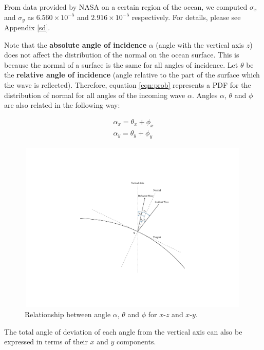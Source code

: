 \documentclass{article}
\begin{document}
From data provided by NASA on a certain region of the ocean, we computed $\sigma_x$ and $\sigma_y$ as $6.560 \times 10^{-5}$ and $2.916 \times 10^{-5}$ respectively. For details, please see Appendix \ref{sd}.

Note that the \textbf{absolute angle of incidence} $\alpha$ (angle with the vertical axis $z$) does not affect the distribution of the normal on the ocean surface. This is because the normal of a surface is the same for all angles of incidence. Let $\theta$ be the \textbf{relative angle of incidence} (angle relative to the part of the surface which the wave is reflected). Therefore, equation \eqref{eqn:prob} represents a PDF for the distribution of normal for all angles of the incoming wave $\alpha$. Angles $\alpha$, $\theta$ and $\phi$ are also related in the following way:

\begin{align}
    \alpha_x = \theta_x + \phi_x\\
    \alpha_y = \theta_y + \phi_y
\end{align}

\begin{figure}[htbp]
    \centering
    \includegraphics[width=420,height=310,clip,trim=200 150 200 150]{angle-rel.pdf}
    \caption{Relationship between angle $\alpha$, $\theta$ and $\phi$ for $x$-$z$ and $x$-$y$.}
    \label{fig:angle_rel}
\end{figure}

The total angle of deviation of each angle from the vertical axis can also be expressed in terms of their $x$ and $y$ components.
\end{document}

